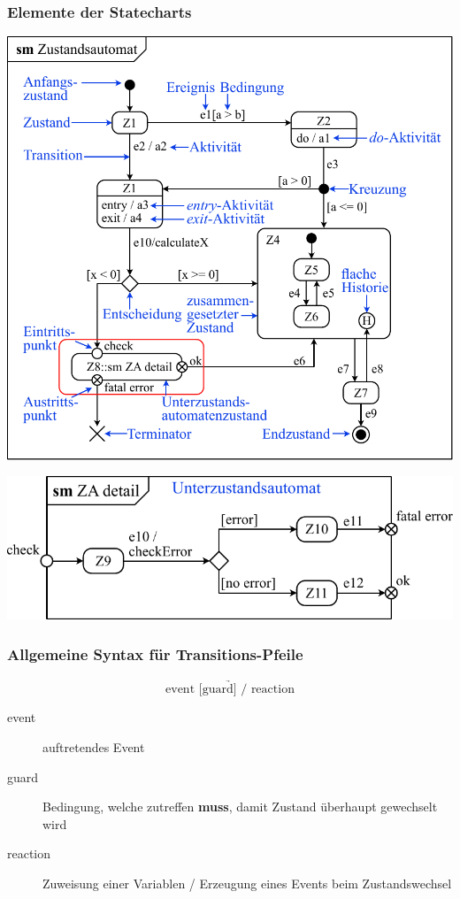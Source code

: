 \subsubsection{Elemente der Statecharts}

\begin{center}
    \includegraphics[width=0.7\columnwidth]{images/statechart_overview.pdf}

    \vspace{0.2cm}

    \includegraphics[width=0.6\columnwidth]{images/statechart_overview_submachine.pdf}
\end{center}


\subsubsection{Allgemeine Syntax für Transitions-Pfeile}

\vspace{-0.2cm}

$$ \underrightarrow{\text{event [guard] / reaction}} $$

\begin{description}
    \item[event] auftretendes Event
    \item[guard] Bedingung, welche zutreffen \textbf{muss}, damit Zustand überhaupt gewechselt wird 
    \item[reaction] Zuweisung einer Variablen / Erzeugung eines Events beim Zustandswechsel 
\end{description}


